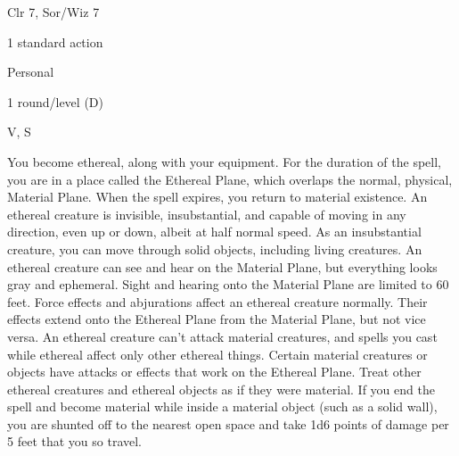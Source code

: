 
\begin{description*}
\item[Level:] Clr 7, Sor/Wiz 7
\item[Casting Time:] 1 standard action
\item[Range:] Personal
\item[Duration:] 1 round/level (D)
\item[Components:] V, S
\end{description*}

You become ethereal, along with your equipment. For the duration of the spell,
you are in a place called the Ethereal Plane, which overlaps the normal, physical,
Material Plane. When the spell expires, you return to material existence.
An ethereal creature is invisible, insubstantial, and capable of moving in any
direction, even up or down, albeit at half normal speed. As an insubstantial creature,
you can move through solid objects, including living creatures. An ethereal creature
can see and hear on the Material Plane, but everything looks gray and ephemeral.
Sight and hearing onto the Material Plane are limited to 60 feet.
Force effects and abjurations affect an ethereal creature normally. Their effects
extend onto the Ethereal Plane from the Material Plane, but not vice versa. An
ethereal creature can't attack material creatures, and spells you cast while ethereal
affect only other ethereal things. Certain material creatures or objects have attacks
or effects that work on the Ethereal Plane.
Treat other ethereal creatures and ethereal objects as if they were material.
If you end the spell and become material while inside a material object (such as
a solid wall), you are shunted off to the nearest open space and take 1d6 points
of damage per 5 feet that you so travel.
